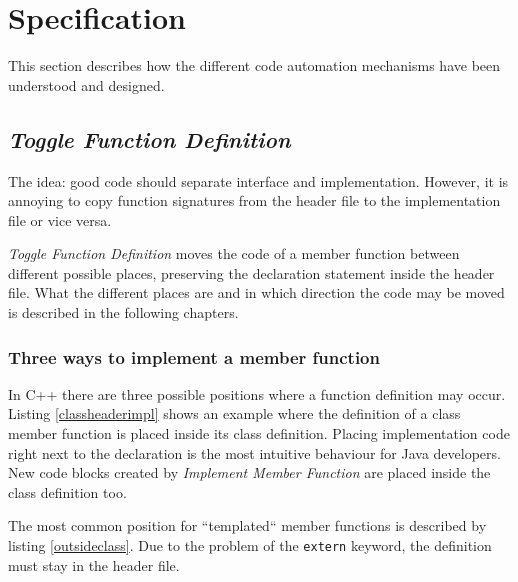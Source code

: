 \chapter{Specification}
\thispagestyle{fancy}

This section describes how the different code automation mechanisms have been
understood and designed.

\section{\textit{Toggle Function Definition}}

The idea: good code should separate interface and implementation. However, it is 
annoying to copy function signatures from the header file to the implementation 
file or vice versa. 

\textit{Toggle Function Definition} moves the code of a member function between 
different possible places, preserving the declaration statement inside the 
header file. What the different places are and in which direction the code may 
be moved is described in the following chapters. 

\subsection{Three ways to implement a member function}

In C++ there are three possible positions where a 
function definition may occur. Listing \ref{classheaderimpl} shows an example
where the definition of a class member function is placed inside its class
definition. Placing implementation code right next to the declaration is the
most intuitive behaviour for Java developers. New code blocks created by
\textit{Implement Member Function} are placed inside the class definition too.



The most common position  for ``templated``
member functions is described by listing \ref{outsideclass}. Due to the problem
of the \texttt{extern} keyword, the definition must stay in the header
file.



